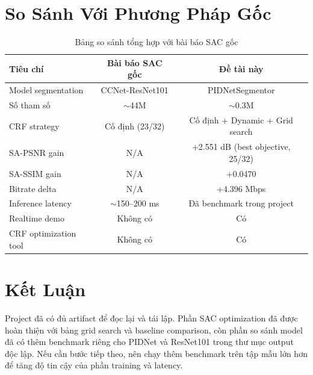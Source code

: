 \documentclass[12pt,a4paper]{article}
\begin{document}
\section{So Sánh Với Phương Pháp Gốc}
\begin{table}[H]
\centering
\caption{Bảng so sánh tổng hợp với bài báo SAC gốc}
\label{tab:vs_paper}
\begin{tabular}{lcc}
\toprule
\textbf{Tiêu chí} & \textbf{Bài báo SAC gốc} & \textbf{Đề tài này} \\
\midrule
Model segmentation & CCNet-ResNet101 & PIDNetSegmentor \\
Số tham số & \(\sim\)44M & \(\sim\)0.3M \\
CRF strategy & Cố định (23/32) & Cố định + Dynamic + Grid search \\
SA-PSNR gain & N/A & +2.551 dB (best objective, 25/32) \\
SA-SSIM gain & N/A & +0.0470 \\
Bitrate delta & N/A & +4.396 Mbps \\
Inference latency & \(\sim\)150--200 ms & Đã benchmark trong project \\
Realtime demo & Không có & Có \\
CRF optimization tool & Không có & Có \\
\bottomrule
\end{tabular}
\end{table}

\section{Kết Luận}
Project đã có đủ artifact để đọc lại và tái lập. Phần SAC optimization đã được hoàn thiện với bảng grid search và baseline comparison, còn phần so sánh model đã có thêm benchmark riêng cho PIDNet và ResNet101 trong thư mục output độc lập. Nếu cần bước tiếp theo, nên chạy thêm benchmark trên tập mẫu lớn hơn để tăng độ tin cậy của phần training và latency.
\end{document}
